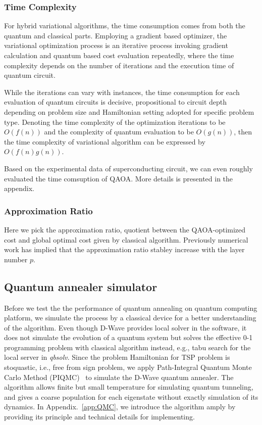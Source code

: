\documentclass[aps,pra,twocolumn,superscriptaddress]{revtex4-2}
\begin{document}
\subsubsection{Time Complexity}
For hybrid variational algorithms, the time consumption comes from both the quantum and classical parts. Employing a gradient based optimizer, the variational optimization process is an iterative process invoking gradient calculation and quantum based cost evaluation repeatedly, where the time complexity depends on the number of iterations and the execution time of quantum circuit. 

While the iterations can vary with instances, the time consumption for each evaluation of quantum circuits is decisive, propositional to circuit depth depending on problem size and  Hamiltonian setting adopted for specific problem type. Denoting the time complexity of the optimization iterations to be $O(f(n))$ and the complexity of quantum evaluation to be $O(g(n))$, then the time complexity of variational algorithm can be expressed by $O(f(n) g(n))$.

Based on the experimental data of superconducting circuit, we can even roughly evaluated the time comsuption of QAOA. More details is presented in the appendix.


\subsubsection{Approximation Ratio}
Here we pick the approximation ratio, quotient between the QAOA-optimized cost and global optimal cost given by classical algorithm.
Previously numerical work has implied that the approximation ratio stabley increase with the layer number $p$.


\subsection{Quantum annealer simulator}
Before we test the the performance of quantum annealing on quantum computing platform, we simulate the process by a classical device for a better understanding of the algorithm. Even though D-Wave provides local solver in the software, it does not simulate the evolution of a quantum system but solves the effective 0-1 programming problem with classical algorithm instead, e.g., tabu search for the local server in \textit{qbsolv}. Since the problem Hamiltonian for TSP problem is stoquastic, i.e., free from sign problem, we apply Path-Integral Quantum Monte Carlo Method (PIQMC)~\cite{path_integral} to simulate the D-Wave quantum annealer. The algorithm allows finite but small temperature for simulating quantum tunneling, and gives a coarse population for each eigenstate without exactly simulation of its dynamics. In Appendix.~\ref{app:QMC}, we introduce the algorithm amply by providing its principle and technical details for implementing.
\end{document}

